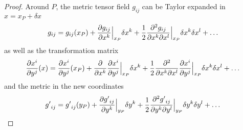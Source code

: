     \begin{proof}
        Around $P$, the metric tensor field $g_{ij}$ can be Taylor expanded in $x = x_P + \delta x$
        \begin{equation} \label{proof5}
            g_{ij} = g_{ij} (x_P) + \frac{\partial g_{ij}}{\partial x^k} \Big\vert_{x_P} \delta x^k + \frac{1}{2} \frac{\partial^2 g_{ij}}{\partial x^k \partial x^l} \Big\vert_{x_P} \delta x^k \delta x^l + \ldots
        \end{equation}
        as well as the transformation matrix 
        \begin{equation}\label{proof6}
            \frac{\partial x^i}{\partial y^j} (x) = \frac{\partial x^i}{\partial y^j} (x_P) + \frac{\partial}{\partial x^k} \frac{\partial x^i}{\partial y^j} \Big\vert_{x_P} \delta x^k + \frac{1}{2} \frac{\partial^2 }{\partial x^k \partial x^l} \frac{\partial x^i}{\partial y^j} \Big\vert_{x_P} \delta x^k \delta x^l + \ldots
        \end{equation}
        and the metric in the new coordinates
        \begin{equation} \label{proof7}
            {g'}_{ij} = {g'}_{ij} (y_P) + \frac{\partial{g'}_{ij}}{\partial y^k} \Big\vert_{y_P} \delta y^k + \frac{1}{2} \frac{\partial^2 {g'}_{ij}}{\partial y^k \partial y^l} \Big\vert_{y_P} \delta y^k \delta y^l + \ldots
        \end{equation}


\end{proof}
